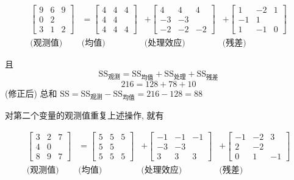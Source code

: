 $$
\begin{array}{cccc}
\left[\begin{array}{ccc}9&6&9\\0&2&\\3&1&2\end{array}\right]
&=\left[\begin{array}{ccc}4&4&4\\4&4&\\4&4&4\end{array}\right]
&+\left[\begin{array}{ccc}4&4&4\\-3&-3&\\-2&-2&-2\end{array}\right]
&+\left[\begin{array}{ccc}1&-2&1\\-1&1&\\1&-1&0\end{array}\right]\\[12pt]
\text{(观测值)}&\text{(均值)}&\text{(处理效应)}&\text{(残差)}
\end{array}
$$

且
\[
\mathrm{SS}_{\text{观测}}=\mathrm{SS}_{\text{均值}}+\mathrm{SS}_{\text{处理}}+\mathrm{SS}_{\text{残差}}
\]
\[
216=128+78+10
\]
(修正后) 总和 $\mathrm{SS}=\mathrm{SS}_{\text{观测}}-\mathrm{SS}_{\text{均值}}=216-128=88$

对第二个变量的观测值重复上述操作, 就有

$$
\begin{array}{cccc}
\left[\begin{array}{ccc}3&2&7\\4&0&\\8&9&7\end{array}\right]
&=\left[\begin{array}{ccc}5&5&5\\5&5&\\5&5&5\end{array}\right]
&+\left[\begin{array}{ccc}-1&-1&-1\\-3&-3&\\3&3&3\end{array}\right]
&+\left[\begin{array}{ccc}-1&-2&3\\2&-2&\\0&1&-1\end{array}\right]\\[12pt]
\text{(观测值)}&\text{(均值)}&\text{(处理效应)}&\text{(残差)}
\end{array}
$$

